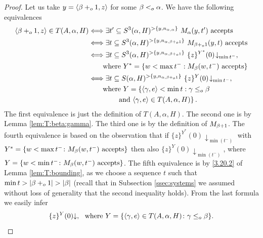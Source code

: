 \documentclass[11pt]{amsart}
\theoremstyle{definition}
\theoremstyle{remark}
\theoremstyle{plain}
\def\la{\langle}
\def\ra{\rangle}
\newcommand{\set}[1]{{\{{#1}\}}}
\def\stops{{\downarrow}}
\newcommand{\leo}{<\sb{o}}
\newcommand{\leqo}{\leq\sb{o}}
\newcommand{\pluso}{+\sb{o}}
\def\stops{{\downarrow}}
\def\ifff{\Longleftrightarrow}
\newcommand{\lorenzo}[1]{\textcolor{blue}{#1}}
\begin{document}
\begin{proof}
Let us take $y=\la \beta \pluso 1, z \ra$ for some $\beta\leo\alpha$. 
We have the following equivalences
\begin{align*}
\langle \beta \pluso 1, z \rangle \in T(A,\alpha,H)
& \ifff \exists t' \subseteq S^3(\alpha, H)^{> \{y,n_{\alpha,\alpha}\}}
   \ M_{\alpha}(y,t') \text{ accepts} \\
& \ifff \exists t \subseteq S^3(\alpha,H)^{> \{y,n_{\alpha,\beta \pluso 1}\}}
   \ M_{\beta \pluso 1}(y,t) \text{ accepts} \\
& \ifff \exists t \subseteq S^3(\alpha,H)^{> \{y,n_{\alpha,\beta \pluso 1}\}}
   \ \{z\}^{Y^*}(0)\!\downarrow_{\min t^-}, \\ 
& \qquad \text{where }
   Y^*=\{ w < \max t^- : M_\beta(w,t^-) \text{ accepts} \} \\
& \ifff \exists t \subseteq S(\alpha,H)^{> \{y,n_{\alpha,\beta \pluso 1}\}}
   \ \{z\}^{Y}(0)\!\downarrow_{\min t^-}, \\ 
& \qquad \text{where }
   Y=\left\{\langle\gamma,e\rangle < \min t :
   \gamma \leqo \beta \right. \\
& \qquad\qquad\left. \text{and } 
   \langle\gamma,e\rangle \in T(A,\alpha,H)\right\}.
\end{align*}
The first equivalence is just the definition of $T(A,\alpha,H)$. 
The second one is by Lemma \ref{lem:T:beta:gamma}. 
The third one is  by the definition of $M\sb{\beta+1}$. 
The fourth equivalence is based on the observation that if $\{z\}^{Y^*}(0)\stops_{\min(t^-)}$ with $Y^*=\set{w < \max t^- \colon M\sb\beta(w, t^-)\mbox{ accepts}}$ then also $\{z\}^{Y}(0)\stops_{\min(t^-)}$, where $Y=\set{w < \min t^- \colon M\sb\beta(w, t^-)\mbox{ accepts}}$.
The fifth equivalence is by \ref{3.20.2} of Lemma \ref{lem:T:bounding}, as we choose a sequence $t$ such that $\min t > |\beta \pluso 1| > |\beta|$ (recall that in Subsection \ref{ssec:systems} we assumed without loss of generality that the second inequality holds).
From the last formula we easily infer 
\begin{equation}\label{eq:T}
\{z\}\sp{Y}(0)\stops, \ \mbox{ where }Y=\set{\langle\gamma,e\rangle\in T(A,\alpha,H)\colon \gamma\leqo\beta}.
\end{equation}


\end{proof}
\end{document}
